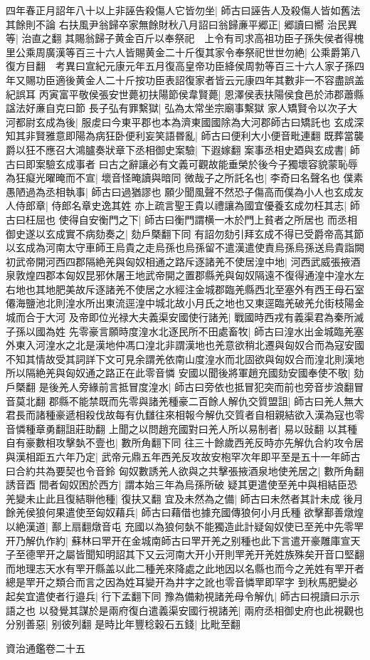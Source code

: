 四年春正月詔年八十以上非誣告殺傷人它皆勿坐|{
	師古曰誣告人及殺傷人皆如舊法其餘則不論}
右扶風尹翁歸卒家無餘財秋八月詔曰翁歸亷平郷正|{
	郷讀曰嚮}
治民異等|{
	治直之翻}
其賜翁歸子黄金百斤以奉祭祀　上令有司求高祖功臣子孫失侯者得槐里公乘周廣漢等百三十六人皆賜黄金二十斤復其家令奉祭祀世世勿絶|{
	公乘爵第八復方目翻　考異曰宣紀元康元年五月復高皇帝功臣絳侯周勃等百三十六人家子孫四年又賜功臣適後黄金人二十斤按功臣表詔復家者皆云元康四年其數非一不容盡誤盖紀誤耳}
丙寅富平敬侯張安世薨初扶陽節侯韋賢薨|{
	恩澤侯表扶陽侯食邑於沛郡蕭縣諡法好亷自克曰節}
長子弘有罪繫獄|{
	弘為太常坐宗廟事繫獄}
家人矯賢令以次子大河都尉玄成為後|{
	服䖍曰今東平郡也本為濟東國國除為大河郡師古曰矯託也}
玄成深知其非賢雅意即陽為病狂卧便利妄笑語昬亂|{
	師古曰便利大小便音毗連翻}
既葬當襲爵以狂不應召大鴻臚奏狀章下丞相御史案驗|{
	下遐嫁翻}
案事丞相史廼與玄成書|{
	師古曰即案驗玄成事者}
曰古之辭讓必有文義可觀故能垂榮於後今子獨壞容貌蒙恥辱為狂癡光曜晻而不宣|{
	壞音怪晻讀與暗同}
微哉子之所託名也|{
	李奇曰名聲名也}
僕素愚陋過為丞相執事|{
	師古曰過猶謬也}
願少聞風聲不然恐子傷高而僕為小人也玄成友人侍郎章|{
	侍郎名章史逸其姓}
亦上疏言聖王貴以禮讓為國宜優養玄成勿枉其志|{
	師古曰枉屈也}
使得自安衡門之下|{
	師古曰衡門謂横一木於門上貧者之所居也}
而丞相御史遂以玄成實不病劾奏之|{
	劾戶槩翻下同}
有詔勿劾引拜玄成不得已受爵帝高其節以玄成為河南太守車師王烏貴之走烏孫也烏孫留不遣漢遣使責烏孫烏孫送烏貴詣闕　初武帝開河西四郡隔絶羌與匈奴相通之路斥逐諸羌不使居湟中地|{
	河西武威張掖酒泉敦煌四郡本匈奴昆邪休屠王地武帝開之置郡縣羌與匈奴隔遠不復得通湟中湟水左右地也其地肥美故斥逐諸羌不使居之水經注金城郡臨羌縣西北至塞外有西王母石室僊海鹽池北則湟水所出東流逕湟中城北故小月氏之地也又東逕臨羌破羌允街枝陽金城而合于大河}
及帝即位光禄大夫義渠安國使行諸羌|{
	戰國時西戎有義渠君為秦所滅子孫以國為姓}
先零豪言願時度湟水北逐民所不田處畜牧|{
	師古曰湟水出金城臨羌塞外東入河湟水之北是漢地仲馮口湟北非謂漢地也羌意欲稍北遷與匈奴合而為寇安國不知其情故受其詞詳下文可見余謂羌依南山度湟水而北固欲與匈奴合而湟北則漢地所以隔絶羌與匈奴通之路正在此零音憐}
安國以聞後將軍趙充國劾安國奉使不敬|{
	劾戶槩翻}
是後羌人旁緣前言抵冒度湟水|{
	師古曰旁依也抵冒犯突而前也旁音步浪翻冒音莫北翻}
郡縣不能禁既而先零與諸羌種豪二百餘人解仇交質盟詛|{
	師古曰羌人無大君長而諸種豪遞相殺伐故每有仇讎往來相報今解仇交質者自相親結欲入漢為寇也零音憐種章勇翻詛莊助翻}
上聞之以問趙充國對曰羌人所以易制者|{
	易以䜴翻}
以其種自有豪數相攻擊埶不壹也|{
	數所角翻下同}
往三十餘歲西羌反時亦先解仇合約攻令居與漢相距五六年乃定|{
	武帝元鼎五年西羌反攻故安枹罕次年即平至是五十一年師古曰合約共為要契也令音鈴}
匈奴數誘羌人欲與之共擊張掖酒泉地使羌居之|{
	數所角翻誘音酉}
間者匈奴困於西方|{
	謂本始三年為烏孫所破}
疑其更遣使至羌中與相結臣恐羌變未止此且復結聨他種|{
	復扶又翻}
宜及未然為之備|{
	師古曰未然者其計未成}
後月餘羌侯狼何果遣使至匈奴藉兵|{
	師古曰藉借也據充國傳狼何小月氏種}
欲擊鄯善燉煌以絶漢道|{
	鄯上扇翻燉音屯}
充國以為狼何埶不能獨造此計疑匈奴使已至羌中先零䍐开乃解仇作約|{
	蘇林曰䍐开在金城南師古曰䍐开羌之别種也此下言遣开豪雕庫宣天子至德䍐开之屬皆聞知明詔其下又云河南大开小开則䍐羌开羌姓族殊矣开音口堅翻而地理志天水有䍐开縣盖以此二種羌來降處之此地因以名縣也而今之羌姓有䍐开者總是䍐开之類合而言之因為姓耳變开為井字之訛也零音憐䍐即罕字}
到秋馬肥變必起矣宜遣使者行邉兵|{
	行下孟翻下同}
豫為備勑視諸羌母令解仇|{
	師古曰視讀曰示示語之也}
以發覺其謀於是兩府復白遣義渠安國行視諸羌|{
	兩府丞相御史府也此視觀也}
分别善惡|{
	别彼列翻}
是時比年豐稔穀石五錢|{
	比毗至翻}


資治通鑑卷二十五
